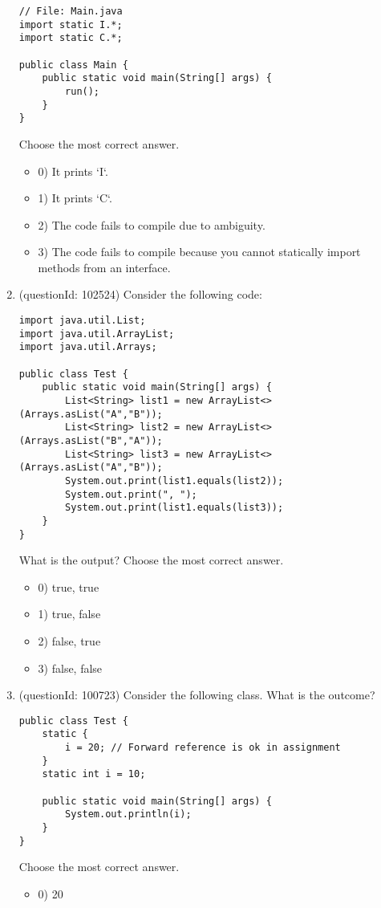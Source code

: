 \documentclass[12pt]{article}
\begin{document}
\begin{enumerate}[label=(\arabic*)]
\begin{verbatim}
// File: Main.java
import static I.*;
import static C.*;

public class Main {
    public static void main(String[] args) {
        run();
    }
}
\end{verbatim}
Choose the most correct answer. 
\begin{itemize}
\item 0) It prints `I`.

\item 1) It prints `C`.

\item 2) The code fails to compile due to ambiguity.

\item 3) The code fails to compile because you cannot statically import methods from an interface.

\end{itemize}
\item (questionId: 102524) Consider the following code:\begin{verbatim}
import java.util.List;
import java.util.ArrayList;
import java.util.Arrays;

public class Test {
    public static void main(String[] args) {
        List<String> list1 = new ArrayList<>(Arrays.asList("A","B"));
        List<String> list2 = new ArrayList<>(Arrays.asList("B","A"));
        List<String> list3 = new ArrayList<>(Arrays.asList("A","B"));
        System.out.print(list1.equals(list2));
        System.out.print(", ");
        System.out.print(list1.equals(list3));
    }
}
\end{verbatim}What is the output?
Choose the most correct answer. 
\begin{itemize}
\item 0) true, true

\item 1) true, false

\item 2) false, true

\item 3) false, false

\end{itemize}
\item (questionId: 100723) Consider the following class. What is the outcome?\n\begin{verbatim}
public class Test {
    static {
        i = 20; // Forward reference is ok in assignment
    }
    static int i = 10;

    public static void main(String[] args) {
        System.out.println(i);
    }
}
\end{verbatim}
Choose the most correct answer. 
\begin{itemize}
\item 0) 20


\end{itemize}
\end{enumerate}
\end{document}
